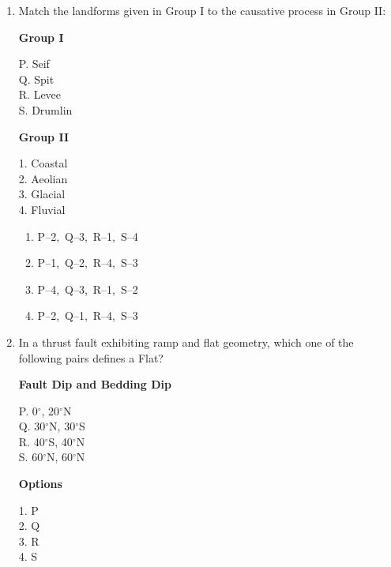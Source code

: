 \documentclass[journal,12pt,onecolumn]{IEEEtran}
\theoremstyle{remark}
\begin{document}
\begin{enumerate}
\item Match the landforms given in Group I to the causative process in Group II:

\begin{multicols}{2}
\textbf{Group I}
\begin{flushleft}
P. Seif\\
Q. Spit\\
R. Levee\\
S. Drumlin
\end{flushleft}

\columnbreak

\textbf{Group II}
\begin{flushleft}
1. Coastal\\
2. Aeolian\\
3. Glacial\\
4. Fluvial
\end{flushleft}
\end{multicols}

\begin{multicols}{2}
\begin{enumerate}
\item P--2,\ Q--3,\ R--1,\ S--4
\item P--1,\ Q--2,\ R--4,\ S--3
\item P--4,\ Q--3,\ R--1,\ S--2
\item P--2,\ Q--1,\ R--4,\ S--3
\end{enumerate}
\end{multicols}


\item In a thrust fault exhibiting ramp and flat geometry, which one of the following pairs defines a Flat?

\begin{multicols}{2}
\textbf{Fault Dip and Bedding Dip}
\begin{flushleft}
P. 0$^\circ$, 20$^\circ$N\\
Q. 30$^\circ$N, 30$^\circ$S\\
R. 40$^\circ$S, 40$^\circ$N\\
S. 60$^\circ$N, 60$^\circ$N
\end{flushleft}

\columnbreak

\textbf{Options}
\begin{flushleft}
1. P\\
2. Q\\
3. R\\
4. S
\end{flushleft}
\end{multicols}


\end{enumerate}
\end{document}
